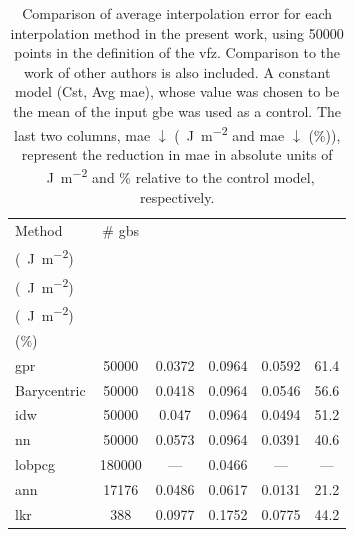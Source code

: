 \documentclass[preprint,12pt]{elsarticle}
\newcommand{\NA}{---} %
\begin{document}
\begin{table}
\caption{Comparison of average interpolation error for each interpolation method in the present work, using \num{50000} points in the definition of the \gls{vfz}. Comparison to the work of other authors is also included. A constant model (Cst, Avg \gls{mae}), whose value was chosen to be the mean of the input \gls{gbe} was used as a control. The last two columns, \gls{mae} $\downarrow$ (\SI{}{\J\per\square\meter} and \gls{mae}   $\downarrow$ (\%)), represent the reduction in \gls{mae} in absolute units of \SI{}{\J\per\square\meter} and \% relative to the control model, respectively.}
\centering
\begin{tabular}{lccccc}
\toprule
Method &
  \# \glspl{gb} &
  \thead{\gls{mae} \\   (\SI{}{\J\per\square\meter})} &
  \thead{Cst, Avg \gls{mae} \\   (\SI{}{\J\per\square\meter})} &
  \thead{\gls{mae} $\downarrow$ \\   (\SI{}{\J\per\square\meter})} &
  \thead{\gls{mae}   $\downarrow$ \\ (\%)} \\ \midrule
\Gls{gpr}                                                     & \num{50000}  & \num{0.0372} & \num{0.0964} & \num{0.0592} & \num{61.4} \\
Barycentric                                                   & \num{50000}  & \num{0.0418} & \num{0.0964} & \num{0.0546} & \num{56.6} \\
\gls{idw}                                                     & \num{50000}  & \num{0.047}  & \num{0.0964} & \num{0.0494} & \num{51.2} \\
\gls{nn}                                                      & \num{50000}  & \num{0.0573} & \num{0.0964} & \num{0.0391} & \num{40.6} \\
\gls{lobpcg}   \cite{shenDeterminingGrainBoundary2019}        & \num{180000} & \NA          & \num{0.0466} & \NA          & \NA        \\
\gls{ann}   \cite{echeverrirestrepoUsingArtificialNeural2014} & \num{17176}  & \num{0.0486} & \num{0.0617} & \num{0.0131} & \num{21.2} \\
\gls{lkr}   \cite{chesserLearningGrainBoundary2020}           & \num{388}    & \num{0.0977} & \num{0.1752} & \num{0.0775} & \num{44.2} \\ \bottomrule
\end{tabular}
\label{tab:mae-error-comparison}
\end{table}
\end{document}
